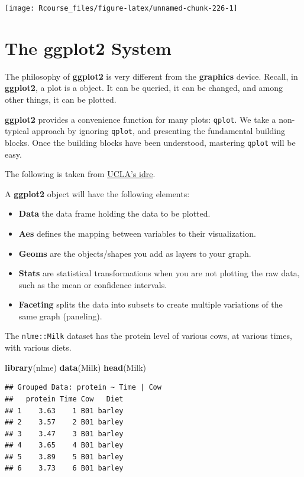 \documentclass[]{book}
\newenvironment{Shaded}{\begin{snugshade}}{\end{snugshade}}
\newcommand{\KeywordTok}[1]{\textcolor[rgb]{0.13,0.29,0.53}{\textbf{#1}}}
\newcommand{\NormalTok}[1]{#1}
\providecommand{\tightlist}{%
  \setlength{\itemsep}{0pt}\setlength{\parskip}{0pt}}
\theoremstyle{definition}
\theoremstyle{definition}
\theoremstyle{definition}
\theoremstyle{remark}
\begin{document}
\texttt{[image: Rcourse\_files/figure-latex/unnamed-chunk-226-1]}

\section{The ggplot2 System}\label{the-ggplot2-system}

The philosophy of \textbf{ggplot2} is very different from the
\textbf{graphics} device. Recall, in \textbf{ggplot2}, a plot is a
object. It can be queried, it can be changed, and among other things, it
can be plotted.

\textbf{ggplot2} provides a convenience function for many plots:
\texttt{qplot}. We take a non-typical approach by ignoring
\texttt{qplot}, and presenting the fundamental building blocks. Once the
building blocks have been understood, mastering \texttt{qplot} will be
easy.

The following is taken from
\href{http://www.ats.ucla.edu/stat/r/seminars/ggplot2_intro/ggplot2_intro.htm}{UCLA's
idre}.

A \textbf{ggplot2} object will have the following elements:

\begin{itemize}
\tightlist
\item
  \textbf{Data} the data frame holding the data to be plotted.
\item
  \textbf{Aes} defines the mapping between variables to their
  visualization.
\item
  \textbf{Geoms} are the objects/shapes you add as layers to your graph.
\item
  \textbf{Stats} are statistical transformations when you are not
  plotting the raw data, such as the mean or confidence intervals.
\item
  \textbf{Faceting} splits the data into subsets to create multiple
  variations of the same graph (paneling).
\end{itemize}

The \texttt{nlme::Milk} dataset has the protein level of various cows,
at various times, with various diets.

\begin{Shaded}
\begin{Highlighting}[]
\KeywordTok{library}\NormalTok{(nlme)}
\KeywordTok{data}\NormalTok{(Milk)}
\KeywordTok{head}\NormalTok{(Milk)}
\end{Highlighting}
\end{Shaded}

\begin{verbatim}
## Grouped Data: protein ~ Time | Cow
##   protein Time Cow   Diet
## 1    3.63    1 B01 barley
## 2    3.57    2 B01 barley
## 3    3.47    3 B01 barley
## 4    3.65    4 B01 barley
## 5    3.89    5 B01 barley
## 6    3.73    6 B01 barley
\end{verbatim}
\end{document}
